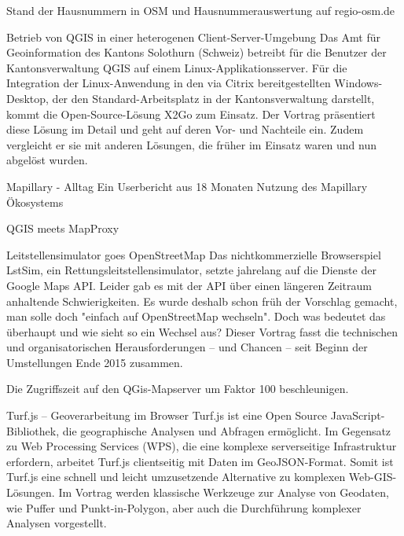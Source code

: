 %
{Stand der Hausnummern in OSM und Hausnummerauswertung auf regio-osm.de}%
{}%
{}


%
{Betrieb von QGIS in einer heterogenen Client-Server-Umgebung}%
{}%
{Das Amt für Geoinformation des Kantons Solothurn (Schweiz) betreibt für die Benutzer der Kantonsverwaltung QGIS auf einem Linux-Applikationsserver. Für die Integration der Linux-Anwendung in den via Citrix bereitgestellten Windows-Desktop, der den Standard-Arbeitsplatz in der Kantonsverwaltung darstellt, kommt die Open-Source-Lösung X2Go zum Einsatz.
Der Vortrag präsentiert diese Lösung im Detail und geht auf deren Vor- und Nachteile ein. Zudem vergleicht er sie mit anderen Lösungen, die früher im Einsatz waren und nun abgelöst wurden.}

%
{Mapillary - Alltag}%
{}%
{Ein Userbericht aus 18 Monaten Nutzung des Mapillary Ökosystems }


%
{QGIS meets MapProxy}%
{}%
{}

%
{Leitstellensimulator goes OpenStreetMap}%
{}%
{Das nichtkommerzielle Browserspiel LstSim, ein Rettungsleitstellensimulator, setzte jahrelang auf die Dienste
der Google Maps API. Leider gab es mit der API über einen längeren Zeitraum anhaltende Schwierigkeiten. Es wurde
deshalb schon früh der Vorschlag gemacht, man solle doch "einfach auf OpenStreetMap wechseln". Doch was bedeutet
das überhaupt und wie sieht so ein Wechsel aus? Dieser Vortrag fasst die technischen und organisatorischen
Herausforderungen – und Chancen – seit Beginn der Umstellungen Ende 2015 zusammen.}

%
{Die Zugriffszeit auf den QGis-Mapserver um Faktor 100 beschleunigen.}%
{}%
{}

%
{Turf.js – Geoverarbeitung im Browser}%
{}%
{Turf.js ist eine Open Source JavaScript-Bibliothek, die geographische Analysen und Abfragen ermöglicht.
Im Gegensatz zu Web Processing Services (WPS), die eine komplexe serverseitige Infrastruktur erfordern,
arbeitet Turf.js clientseitig mit Daten im GeoJSON-Format. Somit ist Turf.js eine schnell und leicht
umzusetzende Alternative zu komplexen Web-GIS-Lösungen.
Im Vortrag werden klassische Werkzeuge zur Analyse von Geodaten, wie Puffer und Punkt-in-Polygon, aber auch
die Durchführung komplexer Analysen vorgestellt.}

